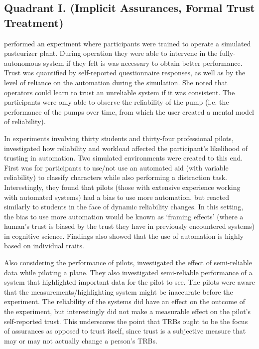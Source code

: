 \subsection{Quadrant I. (Implicit Assurances, Formal Trust Treatment)}\label{sec:q1}
\citet{Muir1996-gt} performed an experiment where participants were trained to operate a simulated pasteurizer plant. During operation they were able to intervene in the fully-autonomous system if they felt is was necessary to obtain better performance. Trust was quantified by self-reported questionnaire responses, as well as by the level of reliance on the automation during the simulation. She noted that operators could learn to trust an unreliable system if it was consistent. The participants were only able to observe the reliability of the pump (i.e. the performance of the pumps over time, from which the user created a mental model of reliability).

In experiments involving thirty students and thirty-four professional pilots, \citet{Riley1996-qm} investigated how reliability and workload affected the participant's likelihood of trusting in automation. Two simulated environments were created to this end. First was for participants to use/not use an automated aid (with variable reliability) to classify characters while also performing a distraction task. Interestingly, they found that pilots (those with extensive experience working with automated systems) had a bias to use more automation, but reacted similarly to students in the face of dynamic reliability changes. In this setting, the bias to use more automation would be known as `framing effects' (where a human's trust is biased by the trust they have in previously encountered systems) in cognitive science. Findings also showed that the use of automation is highly based on individual traits.

Also considering the performance of pilots, \citet{Wickens1999-la} investigated the effect of semi-reliable data while piloting a plane. They also investigated semi-reliable performance of a system that highlighted important data for the pilot to see. The pilots were aware that the measurements/highlighting system might be inaccurate before the experiment. The reliability of the systems did have an effect on the outcome of the experiment, but interestingly did not make a measurable effect on the pilot's self-reported trust. This underscores the point that TRBs ought to be the focus of assurances as opposed to trust itself, since trust is a subjective measure that may or may not actually change a person's TRBs.

